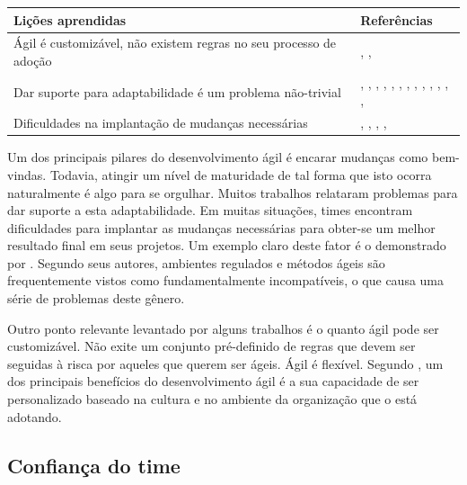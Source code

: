 \begin{table}[H]
	\centering
	\begin{tabularx}{\linewidth}{ | X | p{5cm} | } \hline \textbf{Lições aprendidas} & \textbf{Referências} \\ \hline
		Ágil é customizável, não existem regras no seu processo de adoção & \cite{Hajjdiab2011}, \cite{Piegas2012}, \cite{Hui2013} \\ \hline
		Dar suporte para adaptabilidade é um problema não-trivial & \cite{Block2011}, \cite{Asnawi2012}, \cite{Fitzgerald2013}, \cite{Bustard2013}, \cite{Microsoft2013}, \cite{Lapham2012}, \cite{Claudia2013}, \cite{Nokia2013}, \cite{Rodrigues2013}, \cite{Bastos2013}, \cite{Maciel2013}, \cite{Hui2013}, \cite{Ahmed2008}, \cite{Sahota2012} \\ \hline
		Dificuldades na implantação de mudanças necessárias & \cite{Vieira2013}, \cite{Bastos2013}, \cite{Maciel2013}, \cite{Hui2013}, \cite{Sahota2012} \\ \hline
	\end{tabularx}
\end{table}

Um dos principais pilares do desenvolvimento ágil é encarar mudanças como bem-vindas. Todavia, atingir um nível de maturidade de tal forma que isto ocorra naturalmente é algo para se orgulhar. Muitos trabalhos relataram problemas para dar suporte a esta adaptabilidade. Em muitas situações, times encontram dificuldades para implantar as mudanças necessárias para obter-se um melhor resultado final em seus projetos. Um exemplo claro deste fator é o demonstrado por \cite{Fitzgerald2013}. Segundo seus autores, ambientes regulados e métodos ágeis são frequentemente vistos como fundamentalmente incompatíveis, o que causa uma série de problemas deste gênero.

Outro ponto relevante levantado por alguns trabalhos é o quanto ágil pode ser customizável. Não exite um conjunto pré-definido de regras que devem ser seguidas à risca por aqueles que querem ser ágeis. Ágil é flexível. Segundo \cite{Hajjdiab2011}, um dos principais benefícios do desenvolvimento ágil é a sua capacidade de ser personalizado baseado na cultura e no ambiente da organização que o está adotando.

\subsection{Confiança do time}

